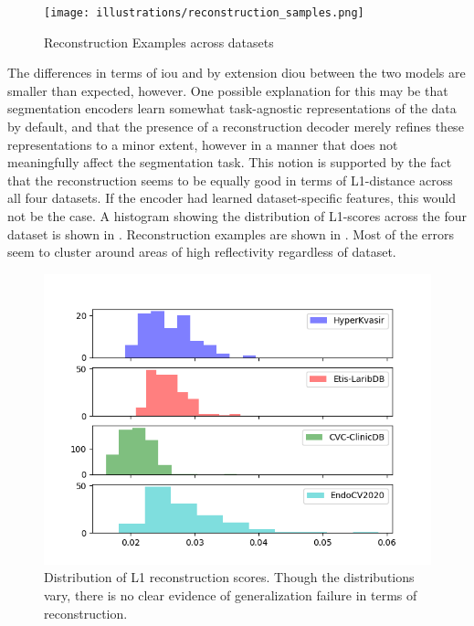     \begin{figure}[ht]
        \centering
        \texttt{[image: illustrations/reconstruction\_samples.png]}
        \caption{Reconstruction Examples across datasets}
        \label{fig:reconstruction}
    \end{figure}

    The differences in terms of \gls{iou} and by extension \gls{diou} between the two models are smaller than expected, however. One possible explanation for this may be that segmentation encoders learn somewhat task-agnostic representations of the data by default, and that the presence of a reconstruction decoder merely refines these representations to a minor extent, however in a manner that does not meaningfully affect the segmentation task. This notion is supported by the fact that the reconstruction seems to be equally good in terms of L1-distance across all four datasets. If the encoder had learned dataset-specific features, this would not be the case. A histogram showing the distribution of L1-scores across the four dataset is shown in . Reconstruction examples are shown in . Most of the errors seem to cluster around areas of high reflectivity regardless of dataset.  
    
    \begin{figure}[ht]
        \centering
        \includegraphics[width=\linewidth]{illustrations/l1_reconstruction.png}
        \caption{Distribution of L1 reconstruction scores. Though the distributions vary, there is no clear evidence of generalization failure in terms of reconstruction.}
        \label{fig:l1_rec}
    \end{figure}
    

